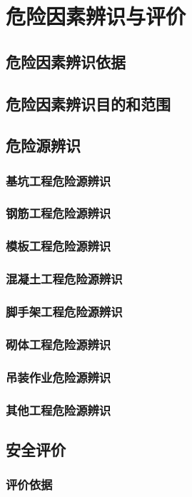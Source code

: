 \section{危险因素辨识与评价}
\subsection{危险因素辨识依据}
\subsection{危险因素辨识目的和范围}
\subsection{危险源辨识}
\subsubsection{基坑工程危险源辨识}
\subsubsection{钢筋工程危险源辨识}
\subsubsection{模板工程危险源辨识}
\subsubsection{混凝土工程危险源辨识}
\subsubsection{脚手架工程危险源辨识}
\subsubsection{砌体工程危险源辨识}
\subsubsection{吊装作业危险源辨识}
\subsubsection{其他工程危险源辨识}
\subsection{安全评价}
\subsubsection{评价依据}

